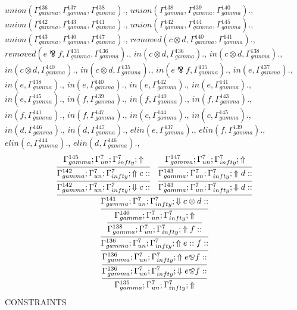 \documentclass[a4paper, 11pt]{article}
\begin{document}
$union(\Gamma_{gamma}^{136}, \Gamma_{gamma}^{137}, \Gamma_{gamma}^{138}).$, $union(\Gamma_{gamma}^{138}, \Gamma_{gamma}^{139}, \Gamma_{gamma}^{140}).$, $union(\Gamma_{gamma}^{142}, \Gamma_{gamma}^{143}, \Gamma_{gamma}^{141}).$, $union(\Gamma_{gamma}^{142}, \Gamma_{gamma}^{144}, \Gamma_{gamma}^{145}).$, $union(\Gamma_{gamma}^{143}, \Gamma_{gamma}^{146}, \Gamma_{gamma}^{147}).$, $removed(c \otimes d, \Gamma_{gamma}^{140}, \Gamma_{gamma}^{141}).$, $removed(e \bindnasrepma f, \Gamma_{gamma}^{135}, \Gamma_{gamma}^{136}).$, $in(c \otimes d, \Gamma_{gamma}^{136}).$, $in(c \otimes d, \Gamma_{gamma}^{138}).$, $in(c \otimes d, \Gamma_{gamma}^{140}).$, $in(c \otimes d, \Gamma_{gamma}^{135}).$, $in(e \bindnasrepma f, \Gamma_{gamma}^{135}).$, $in(e, \Gamma_{gamma}^{137}).$, $in(e, \Gamma_{gamma}^{138}).$, $in(e, \Gamma_{gamma}^{140}).$, $in(e, \Gamma_{gamma}^{142}).$, $in(e, \Gamma_{gamma}^{141}).$, $in(e, \Gamma_{gamma}^{145}).$, $in(f, \Gamma_{gamma}^{139}).$, $in(f, \Gamma_{gamma}^{140}).$, $in(f, \Gamma_{gamma}^{143}).$, $in(f, \Gamma_{gamma}^{141}).$, $in(f, \Gamma_{gamma}^{147}).$, $in(c, \Gamma_{gamma}^{144}).$, $in(c, \Gamma_{gamma}^{145}).$, $in(d, \Gamma_{gamma}^{146}).$, $in(d, \Gamma_{gamma}^{147}).$, $elin(e, \Gamma_{gamma}^{137}).$, $elin(f, \Gamma_{gamma}^{139}).$, $elin(c, \Gamma_{gamma}^{144}).$, $elin(d, \Gamma_{gamma}^{146}).$, 
{\small
\[
\infer{\Gamma_{ gamma}^{135} ; \Gamma_{un}^{7} ; \Gamma_{ infty}^{7} ;  \Uparrow }
{\infer{\Gamma_{ gamma}^{136} ; \Gamma_{un}^{7} ; \Gamma_{ infty}^{7} ;  \Downarrow e \bindnasrepma f :: }
{\infer{\Gamma_{ gamma}^{136} ; \Gamma_{un}^{7} ; \Gamma_{ infty}^{7} ;  \Uparrow e \bindnasrepma f :: }
{\infer{\Gamma_{ gamma}^{136} ; \Gamma_{un}^{7} ; \Gamma_{ infty}^{7} ;  \Uparrow e :: f :: }
{\infer{\Gamma_{ gamma}^{138} ; \Gamma_{un}^{7} ; \Gamma_{ infty}^{7} ;  \Uparrow f :: }
{\infer{\Gamma_{ gamma}^{140} ; \Gamma_{un}^{7} ; \Gamma_{ infty}^{7} ;  \Uparrow }
{\infer{\Gamma_{ gamma}^{141} ; \Gamma_{un}^{7} ; \Gamma_{ infty}^{7} ;  \Downarrow c \otimes d :: }
{\infer{\Gamma_{ gamma}^{142} ; \Gamma_{un}^{7} ; \Gamma_{ infty}^{7} ;  \Downarrow c :: }
{\infer{\Gamma_{ gamma}^{142} ; \Gamma_{un}^{7} ; \Gamma_{ infty}^{7} ;  \Uparrow c :: }
{\Gamma_{ gamma}^{145} ; \Gamma_{un}^{7} ; \Gamma_{ infty}^{7} ;  \Uparrow }}
&
\infer{\Gamma_{ gamma}^{143} ; \Gamma_{un}^{7} ; \Gamma_{ infty}^{7} ;  \Downarrow d :: }
{\infer{\Gamma_{ gamma}^{143} ; \Gamma_{un}^{7} ; \Gamma_{ infty}^{7} ;  \Uparrow d :: }
{\Gamma_{ gamma}^{147} ; \Gamma_{un}^{7} ; \Gamma_{ infty}^{7} ;  \Uparrow }}}}}}}}}
\]
}
CONSTRAINTS
\end{document}
